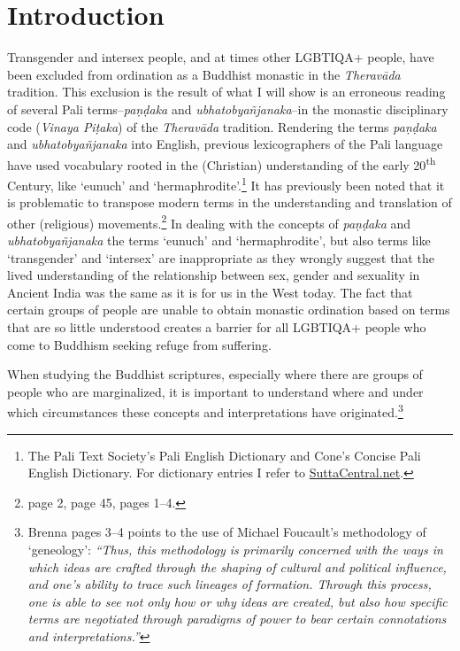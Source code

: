 \section{Introduction}
Transgender and intersex people, and at times other LGBTIQA+ people, have been excluded from ordination as a Buddhist monastic in the {\em Theravāda} tradition. This exclusion is the result of what I will show is an erroneous reading of several Pali terms--{\em paṇḍaka} and {\em ubhatob­yañ­janaka}--in the monastic disciplinary code ({\em Vinaya Piṭaka}) of the {\em Theravāda} tradition. Rendering the terms {\em paṇḍaka} and {\em ubhatob­yañ­janaka} into English, previous lexicographers of the Pali language have used vocabulary rooted in the (Christian) understanding of the early 20\textsuperscript{th} Century, like `eunuch' and `hermaphrodite'.\footnote{The Pali Text Society's Pali English Dictionary and Cone's Concise Pali English Dictionary. For dictionary entries I refer to \href{https://suttacentral.net/}{SuttaCentral.net}.} It has previously been noted that it is problematic to transpose modern terms in the understanding and translation of other (religious) movements.\footnote{\cite{maes} page 2, \cite{dudas} page 45, \cite{artinger} pages 1–4.} In dealing with the concepts of {\em paṇḍaka} and {\em ubhatob­yañ­janaka} the terms `eunuch' and `hermaphrodite', but also terms like `transgender' and `intersex' are inappropriate as they wrongly suggest that the lived understanding of the relationship between sex, gender and sexuality in Ancient India was the same as it is for us in the West today. The fact that certain groups of people are unable to obtain monastic ordination based on terms that are so little understood creates a barrier for all LGBTIQA+ people who come to Buddhism seeking refuge from suffering.

When studying the Buddhist scriptures, especially where there are groups of people who are marginalized, it is important to understand where and under which circumstances these concepts and interpretations have originated.\footnote{Brenna \cite{artinger} pages 3–4 points to the use of Michael Foucault's methodology of `geneology': {\em ``Thus, this methodology is primarily concerned with the ways in which ideas are crafted through the shaping of cultural and political influence, and one's ability to trace such lineages of formation. Through this process, one is able to see not only how or why ideas are created, but also how specific terms are negotiated through paradigms of power to bear certain connotations and interpretations.''}}

